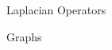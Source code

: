 \documentclass[../main.tex]{subfiles}
\begin{document}
    \begin{section}{Laplacian Operators}
           
    \end{section}
    \newpage
    \begin{section}{Graphs} 
            
    \end{section}
\end{document}
